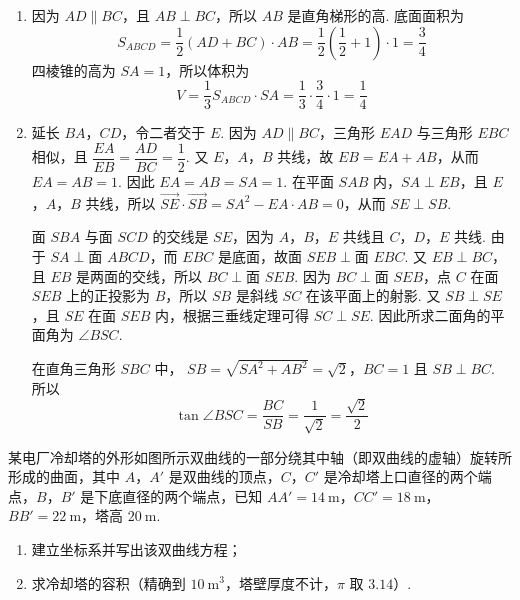 \begin{solution}
\begin{enumerate}
\item 因为 \(AD\parallel BC\)，且 \(AB\perp BC\)，所以 \(AB\) 是直角梯形的高. 底面面积为
\[
S_{ABCD}=\frac12(AD+BC)\cdot AB=\frac12\left(\frac12+1\right)\cdot1=\frac34
\]
四棱锥的高为 \(SA=1\)，所以体积为
\[
V=\frac13S_{ABCD}\cdot SA=\frac13\cdot\frac34\cdot1=\frac14
\]

\item 延长 \(BA\)，\(CD\)，令二者交于 \(E\). 因为 \(AD\parallel BC\)，三角形 \(EAD\) 与三角形 \(EBC\) 相似，且 \(\dfrac{EA}{EB}=\dfrac{AD}{BC}=\dfrac12\). 又 \(E\)，\(A\)，\(B\) 共线，故 \(EB=EA+AB\)，从而 \(EA=AB=1\). 因此 \(EA=AB=SA=1\). 在平面 \(SAB\) 内，\(SA\perp EB\)，且 \(E\)，\(A\)，\(B\) 共线，所以
\(\overrightarrow{SE}\cdot\overrightarrow{SB}=SA^2-EA\cdot AB=0\)，从而 \(SE\perp SB\).

面 \(SBA\) 与面 \(SCD\) 的交线是 \(SE\)，因为 \(A\)，\(B\)，\(E\) 共线且 \(C\)，\(D\)，\(E\) 共线. 由于 \(SA\perp\text{面 }ABCD\)，而 \(EBC\) 是底面，故面 \(SEB\perp\text{面 }EBC\). 又 \(EB\perp BC\)，且 \(EB\) 是两面的交线，所以 \(BC\perp\text{面 }SEB\). 因为 \(BC\perp\text{面 }SEB\)，点 \(C\) 在面 \(SEB\) 上的正投影为 \(B\)，所以 \(SB\) 是斜线 \(SC\) 在该平面上的射影. 又 \(SB\perp SE\)，且 \(SE\) 在面 \(SEB\) 内，根据三垂线定理可得 \(SC\perp SE\). 因此所求二面角的平面角为 \(\angle BSC\).

在直角三角形 \(SBC\) 中，
\(SB=\sqrt{SA^2+AB^2}=\sqrt2\)，\(BC=1\)
且 \(SB\perp BC\). 所以
\[
\tan\angle BSC=\frac{BC}{SB}=\frac1{\sqrt2}=\frac{\sqrt2}{2}
\]
\end{enumerate}
\end{solution}

\begin{problem}
某电厂冷却塔的外形如图所示双曲线的一部分绕其中轴（即双曲线的虚轴）旋转所形成的曲面，其中 \(A\)，\(A'\) 是双曲线的顶点，\(C\)，\(C'\) 是冷却塔上口直径的两个端点，\(B\)，\(B'\) 是下底直径的两个端点，已知 \(AA'=14\mathrm{~m}\)，\(CC'=18\mathrm{~m}\)，\(BB'=22\mathrm{~m}\)，塔高 \(20\mathrm{~m}\).

\begin{enumerate}
\item 建立坐标系并写出该双曲线方程；
\item 求冷却塔的容积（精确到 \(10\mathrm{~m^3}\)，塔壁厚度不计，\(\pi\) 取 \(3.14\)）.
\end{enumerate}

\end{problem}

